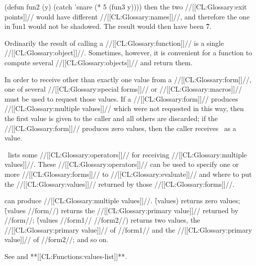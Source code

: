 \code
 (defun fun2 (y)
   (catch 'snare (* 5 (fun3 y)))) \endcode then the two //[[CL:Glossary:exit points]]//  would have different //[[CL:Glossary:names]]//, and therefore the one in \f{fun1} would not be shadowed.  The result would then have been \f{7}.

\endSubsection%


Ordinarily the result of calling a //[[CL:Glossary:function]]// is a single //[[CL:Glossary:object]]//. Sometimes, however, it is convenient for a function to compute several //[[CL:Glossary:objects]]// and return them.

In order to receive other than exactly one value from a //[[CL:Glossary:form]]//, one of several //[[CL:Glossary:special forms]]// or //[[CL:Glossary:macros]]// must be used to request those values.  If a //[[CL:Glossary:form]]// produces //[[CL:Glossary:multiple values]]// which were not requested in this way, then the first value is given to the caller and all others are discarded; if the //[[CL:Glossary:form]]// produces zero values, then the caller receives \nil\ as a value.

\Thenextfigure\ lists  some //[[CL:Glossary:operators]]// for receiving //[[CL:Glossary:multiple values]]//. These //[[CL:Glossary:operators]]// can be used to specify 
    one or more //[[CL:Glossary:forms]]// to //[[CL:Glossary:evaluate]]//  and where to put the //[[CL:Glossary:values]]// returned by those //[[CL:Glossary:forms]]//.


 can produce //[[CL:Glossary:multiple values]]//. \f{(values)} returns zero values; \f{(values //form//)} returns the //[[CL:Glossary:primary value]]// returned by //form//; \f{(values //form1// //form2//)} returns two values,
    the //[[CL:Glossary:primary value]]// of //form1// and the //[[CL:Glossary:primary value]]// of //form2//; and so on.

See  and **[[CL:Functions:values-list]]**.

\endSubsection%

